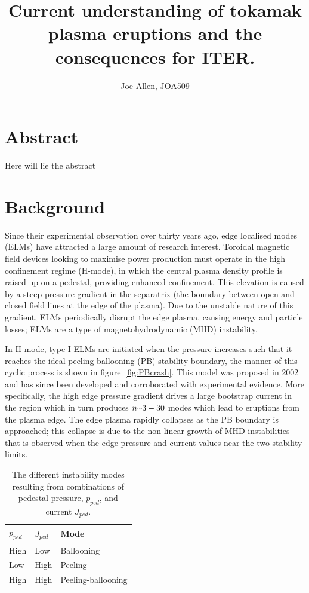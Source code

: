 \documentclass[12pt]{article}  %
\providecommand{\squiggle}{\raise.17ex\hbox{$\scriptstyle\sim$}} %
\begin{document}
\title{Current understanding of tokamak plasma eruptions and the consequences for ITER.}
\author{Joe Allen, JOA509}
\maketitle

\section{Abstract}
Here will lie the abstract

\section{Background}\label{sec:Bg}
Since their experimental observation over thirty years ago\cite{Keilhacker1984}, edge localised modes (ELMs) have attracted a large amount of research interest. Toroidal magnetic field devices looking to maximise power production must operate in the high confinement regime (H-mode), in which the central plasma density profile is raised up on a pedestal, providing enhanced confinement.\cite{Wagner2007} This elevation is caused by a steep pressure gradient in the separatrix (the boundary between open and closed field lines at the edge of the plasma). Due to the unstable nature of this gradient, ELMs periodically disrupt the edge plasma, causing energy and particle losses; ELMs are a type of magnetohydrodynamic (MHD) instability.\cite{Zohm1996}

In H-mode, type I ELMs are initiated when the pressure increases such that it reaches the ideal peeling-ballooning (PB) stability boundary, the manner of this cyclic process is shown in figure~\ref{fig:PBcrash}. This model was proposed in 2002\cite{Snyder2002} and has since been developed and corroborated with experimental evidence.\cite{Wilson2002} More specifically, the high edge pressure gradient drives a large bootstrap current in the region which in turn produces $n\squiggle 3-30$ modes\cite{Snyder2009} which lead to eruptions from the plasma edge. The edge plasma rapidly collapses as the PB boundary is approached; this collapse is due to the non-linear growth of MHD instabilities \cite{Wilson2004} that is observed when the edge pressure and current values near the two stability limits.


\begin{table}[h]
\centering
\caption{The different instability modes resulting from combinations of pedestal pressure, $p_{ped}$, and current $J_{ped}$.\cite{Lang2013}}
\label{tab:PB}
\begin{tabular}{lll}
\hline
\textbf{$p_{ped}$}   & \textbf{$J_{ped}$} & \textbf{Mode} \\ \hline
   High              &        Low         &      Ballooning        \\
   Low               &        High        &      Peeling           \\
   High              &        High        &      Peeling-ballooning
\end{tabular}
\end{table}
\end{document}
